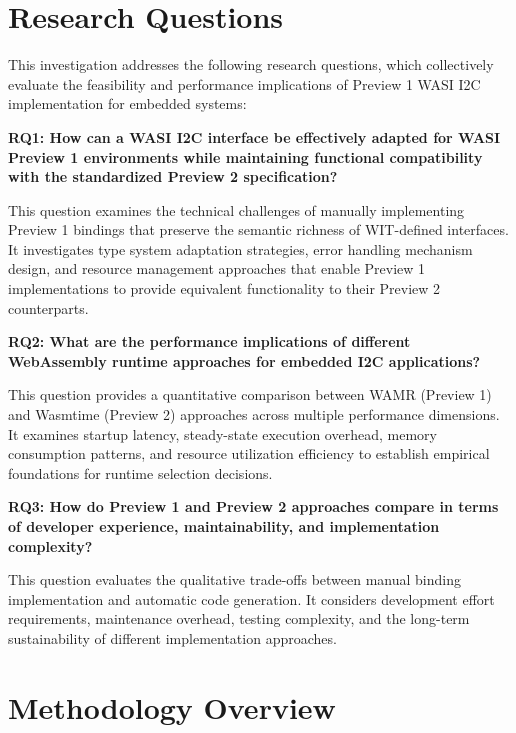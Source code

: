 
\section{Research Questions}
\label{sec:research-questions}

This investigation addresses the following research questions, which collectively evaluate the feasibility and performance implications of Preview 1 WASI I2C implementation for embedded systems:

\textbf{RQ1: How can a WASI I2C interface be effectively adapted for WASI Preview 1 environments while maintaining functional compatibility with the standardized Preview 2 specification?}

This question examines the technical challenges of manually implementing Preview 1 bindings that preserve the semantic richness of WIT-defined interfaces. It investigates type system adaptation strategies, error handling mechanism design, and resource management approaches that enable Preview 1 implementations to provide equivalent functionality to their Preview 2 counterparts.

\textbf{RQ2: What are the performance implications of different WebAssembly runtime approaches for embedded I2C applications?}

This question provides a quantitative comparison between WAMR (Preview 1) and Wasmtime (Preview 2) approaches across multiple performance dimensions. It examines startup latency, steady-state execution overhead, memory consumption patterns, and resource utilization efficiency to establish empirical foundations for runtime selection decisions.

\textbf{RQ3: How do Preview 1 and Preview 2 approaches compare in terms of developer experience, maintainability, and implementation complexity?}

This question evaluates the qualitative trade-offs between manual binding implementation and automatic code generation. It considers development effort requirements, maintenance overhead, testing complexity, and the long-term sustainability of different implementation approaches.

\section{Methodology Overview}
\label{sec:methodology-overview}

